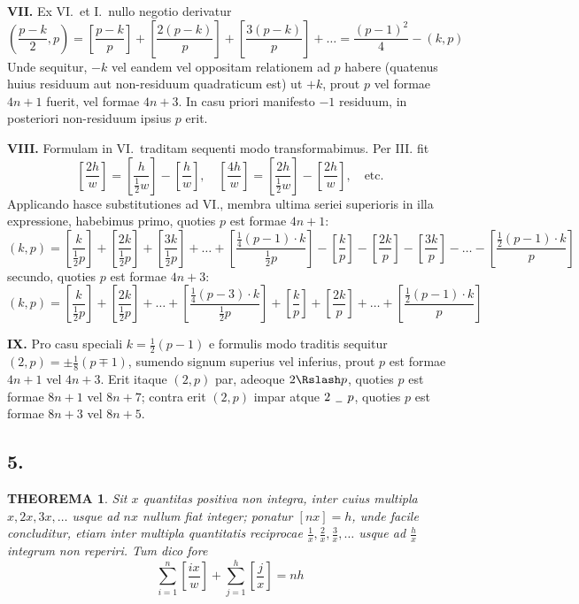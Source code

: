 \documentclass[12pt,a4paper]{article}
\theoremstyle{plain}
\newtheorem{theorem}{THEOREMA}[section]
\begin{document}
\medskip
\noindent\textbf{VII.} Ex VI.\ et I.\ nullo negotio derivatur
\[
\left(\frac{p-k}{2}, p\right) = \left[\frac{p-k}{p}\right] + \left[\frac{2(p-k)}{p}\right] + \left[\frac{3(p-k)}{p}\right] + \ldots = \frac{(p-1)^2}{4} - (k, p)
\]
Unde sequitur, $-k$ vel eandem vel oppositam relationem ad $p$ habere (quatenus huius residuum aut non-residuum quadraticum est) ut $+k$, prout $p$ vel formae $4n+1$ fuerit, vel formae $4n+3$. In casu priori manifesto $-1$ residuum, in posteriori non-residuum ipsius $p$ erit.

\medskip
\noindent\textbf{VIII.} Formulam in VI.\ traditam sequenti modo transformabimus. Per III. fit
\[
\left[\frac{2h}{w}\right] = \left[\frac{h}{\frac{1}{2}w}\right] - \left[\frac{h}{w}\right], \quad \left[\frac{4h}{w}\right] = \left[\frac{2h}{\frac{1}{2}w}\right] - \left[\frac{2h}{w}\right], \quad \text{etc.}
\]
Applicando hasce substitutiones ad VI., membra ultima seriei superioris in illa expressione, habebimus primo, quoties $p$ est formae $4n+1$:
\[
(k, p) = \left[\frac{k}{\frac{1}{2}p}\right] + \left[\frac{2k}{\frac{1}{2}p}\right] + \left[\frac{3k}{\frac{1}{2}p}\right] + \ldots + \left[\frac{\frac{1}{4}(p-1) \cdot k}{\frac{1}{2}p}\right] - \left[\frac{k}{p}\right] - \left[\frac{2k}{p}\right] - \left[\frac{3k}{p}\right] - \ldots - \left[\frac{\frac{1}{2}(p-1) \cdot k}{p}\right]
\]
secundo, quoties $p$ est formae $4n+3$:
\[
(k, p) = \left[\frac{k}{\frac{1}{2}p}\right] + \left[\frac{2k}{\frac{1}{2}p}\right] + \ldots + \left[\frac{\frac{1}{4}(p-3) \cdot k}{\frac{1}{2}p}\right] + \left[\frac{k}{p}\right] + \left[\frac{2k}{p}\right] + \ldots + \left[\frac{\frac{1}{2}(p-1) \cdot k}{p}\right]
\]

\medskip
\noindent\textbf{IX.} Pro casu speciali $k = \frac{1}{2}(p-1)$ e formulis modo traditis sequitur $(2, p) = \pm\frac{1}{8}(p \mp 1)$, sumendo signum superius vel inferius, prout $p$ est formae $4n+1$ vel $4n+3$. Erit itaque $(2, p)$ par, adeoque $2 \Rslash p$, quoties $p$ est formae $8n+1$ vel $8n+7$; contra erit $(2, p)$ impar atque $2 \,\mathrel{\rule{0pt}{2pt}\rule[-1pt]{5pt}{0.4pt}}\, p$, quoties $p$ est formae $8n+3$ vel $8n+5$.

\subsection*{5.}

\begin{theorem}
Sit $x$ quantitas positiva non integra, inter cuius multipla $x, 2x, 3x, \ldots$ usque ad $nx$ nullum fiat integer; ponatur $[nx] = h$, unde facile concluditur, etiam inter multipla quantitatis reciprocae $\frac{1}{x}, \frac{2}{x}, \frac{3}{x}, \ldots$ usque ad $\frac{h}{x}$ integrum non reperiri. Tum dico fore
\[
\sum_{i=1}^{n} \left[\frac{ix}{w}\right] + \sum_{j=1}^{h} \left[\frac{j}{x}\right] = nh
\]
\end{theorem}
\end{document}
